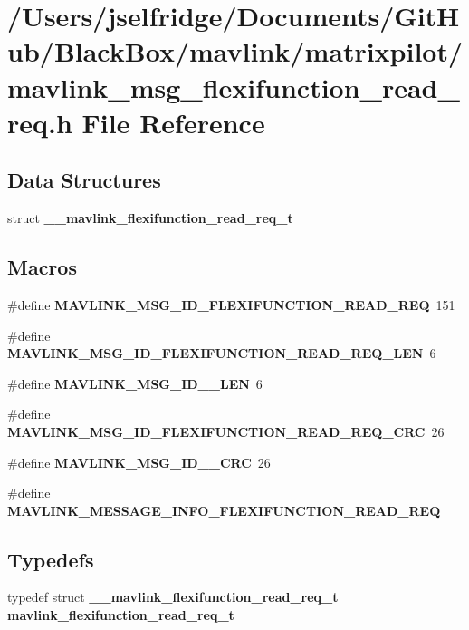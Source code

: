 \section{/\+Users/jselfridge/\+Documents/\+Git\+Hub/\+Black\+Box/mavlink/matrixpilot/mavlink\+\_\+msg\+\_\+flexifunction\+\_\+read\+\_\+req.h File Reference}
\label{mavlink__msg__flexifunction__read__req_8h}
\subsection*{Data Structures}
\begin{DoxyCompactItemize}
\item 
struct \textbf{ \+\_\+\+\_\+mavlink\+\_\+flexifunction\+\_\+read\+\_\+req\+\_\+t}
\end{DoxyCompactItemize}
\subsection*{Macros}
\begin{DoxyCompactItemize}
\item 
\#define \textbf{ M\+A\+V\+L\+I\+N\+K\+\_\+\+M\+S\+G\+\_\+\+I\+D\+\_\+\+F\+L\+E\+X\+I\+F\+U\+N\+C\+T\+I\+O\+N\+\_\+\+R\+E\+A\+D\+\_\+\+R\+EQ}~151
\item 
\#define \textbf{ M\+A\+V\+L\+I\+N\+K\+\_\+\+M\+S\+G\+\_\+\+I\+D\+\_\+\+F\+L\+E\+X\+I\+F\+U\+N\+C\+T\+I\+O\+N\+\_\+\+R\+E\+A\+D\+\_\+\+R\+E\+Q\+\_\+\+L\+EN}~6
\item 
\#define \textbf{ M\+A\+V\+L\+I\+N\+K\+\_\+\+M\+S\+G\+\_\+\+I\+D\+\_\+\_\+\+L\+EN}~6
\item 
\#define \textbf{ M\+A\+V\+L\+I\+N\+K\+\_\+\+M\+S\+G\+\_\+\+I\+D\+\_\+\+F\+L\+E\+X\+I\+F\+U\+N\+C\+T\+I\+O\+N\+\_\+\+R\+E\+A\+D\+\_\+\+R\+E\+Q\+\_\+\+C\+RC}~26
\item 
\#define \textbf{ M\+A\+V\+L\+I\+N\+K\+\_\+\+M\+S\+G\+\_\+\+I\+D\+\_\+\_\+\+C\+RC}~26
\item 
\#define \textbf{ M\+A\+V\+L\+I\+N\+K\+\_\+\+M\+E\+S\+S\+A\+G\+E\+\_\+\+I\+N\+F\+O\+\_\+\+F\+L\+E\+X\+I\+F\+U\+N\+C\+T\+I\+O\+N\+\_\+\+R\+E\+A\+D\+\_\+\+R\+EQ}
\end{DoxyCompactItemize}
\subsection*{Typedefs}
\begin{DoxyCompactItemize}
\item 
typedef struct \textbf{ \+\_\+\+\_\+mavlink\+\_\+flexifunction\+\_\+read\+\_\+req\+\_\+t} \textbf{ mavlink\+\_\+flexifunction\+\_\+read\+\_\+req\+\_\+t}
\end{DoxyCompactItemize}


